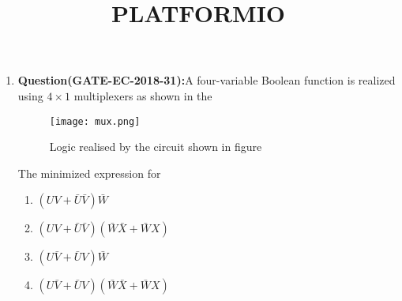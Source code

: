 \documentclass[12pt]{article}
\begin{document}
\title{\textbf{PLATFORMIO}}
\date{}
\maketitle
\begin{enumerate}
    \item \textbf{Question(GATE-EC-2018-31):}A four-variable Boolean function is realized using $4\times 1$ multiplexers as shown in the 
    \begin{figure}[!h]
        \centering
        \texttt{[image: mux.png]}
        \caption{Logic realised by the circuit shown in figure}
        \label{fig:mux}
    \end{figure}

   The minimized expression for 
    \begin{enumerate}
       \item $\left ( UV+\bar{U}\bar{V} \right )\bar{W}$
       \item $\left ( UV+\bar{U}\bar{V} \right )\left ( \bar{W}\bar{X}+\bar{W}X\right )$
       \item $\left ( U\bar{V}+\bar{U}V \right )\bar{W}$
       \item $\left ( U\bar{V}+\bar{U}V \right )\left ( \bar{W}\bar{X}+\bar{W}X\right )$
    \end{enumerate}


\end{enumerate}
\end{document}
